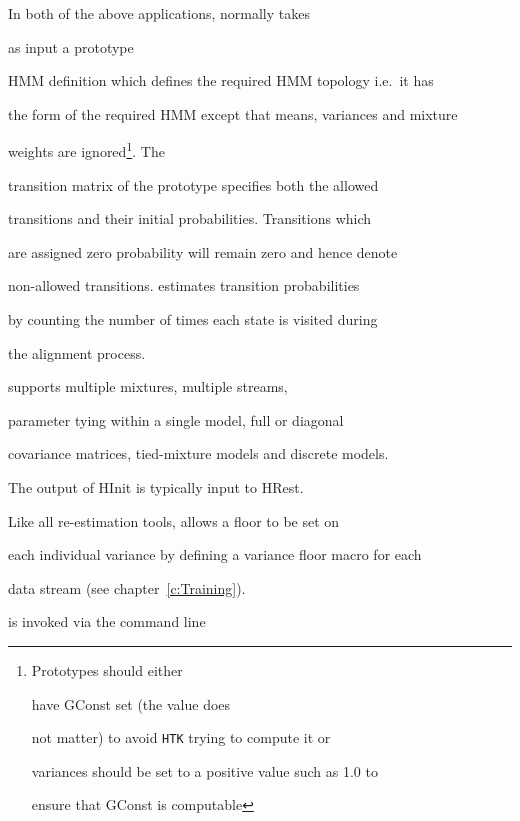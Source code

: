 In both of the above applications,  normally takes 


as input a prototype


HMM definition which defines the required HMM topology i.e.\ it has


the form of the required HMM except that means, variances and mixture


weights are ignored\footnote{Prototypes should either


have GConst set (the value does


not matter) to avoid {\tt HTK} trying to compute it or


variances should be set to a positive value such as 1.0 to


ensure that GConst is computable}.  The


transition matrix of the prototype specifies both the allowed


transitions and their initial probabilities.  Transitions which


are assigned zero probability will remain zero and hence denote


non-allowed transitions.   estimates transition probabilities


by counting the number of times each state is visited during


the alignment process.





 supports multiple mixtures, multiple streams,


parameter tying within a single model, full or diagonal


covariance matrices, tied-mixture models and discrete models.  


The output of HInit is typically input to HRest.





Like all re-estimation tools,  allows a floor to  be set on


each individual variance by defining a variance floor macro for each


data stream (see chapter~\ref{c:Training}).


 







 is invoked via the command line


